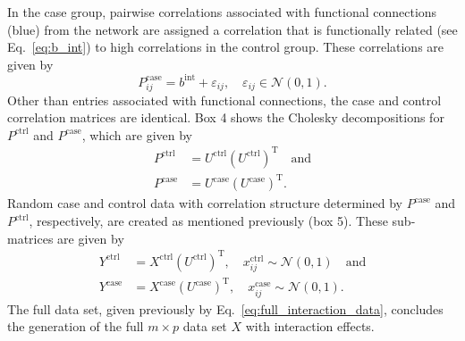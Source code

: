 \documentclass[10pt,letterpaper]{article}\usepackage[]{graphicx}\usepackage[]{color}
\begin{document}
In the case group, pairwise correlations associated with functional connections (\textcolor{blue!80}{blue}) from the network are assigned a correlation that is functionally related (see Eq.~\ref{eq:b_int}) to high correlations in the control group. These correlations are given by
\begin{equation}\label{eq:case_connected_corrs}
P^\text{case}_{ij} = b^\text{int} + \varepsilon_{ij}, \quad \varepsilon_{ij} \in \mathcal{N}(0,1).
\end{equation}
Other than entries associated with functional connections, the case and control correlation matrices are identical. Box 4 shows the Cholesky decompositions for $P^\text{ctrl}$ and $P^\text{case}$, which are given by
\begin{equation}\label{eq:cholesky_decomp}
\begin{aligned}
P^\text{ctrl} &= U^\text{ctrl} \left(U^\text{ctrl}\right)^\text{T} \quad \text{and}\\
P^\text{case} &= U^\text{case} \left(U^\text{case}\right)^\text{T}.
\end{aligned}
\end{equation}
Random case and control data with correlation structure determined by $P^\text{case}$ and $P^\text{ctrl}$, respectively, are created as mentioned previously (box 5). These sub-matrices are given by
\begin{equation}\label{eq:case_control_sub-mats}
\begin{aligned}
Y^\text{ctrl} &= X^\text{ctrl} \left(U^\text{ctrl}\right)^\text{T}, \quad x^\text{ctrl}_{ij} \sim \mathcal{N}(0,1) \quad \text{and}\\
Y^\text{case} &= X^\text{case} \left(U^\text{case}\right)^\text{T}, \quad x^\text{case}_{ij} \sim \mathcal{N}(0,1).
\end{aligned}
\end{equation}
The full data set, given previously by Eq.~\ref{eq:full_interaction_data}, concludes the generation of the full $m \times p$ data set $X$ with interaction effects.
\end{document}
